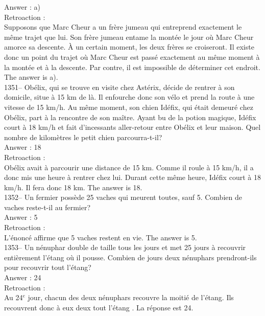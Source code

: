 ﻿\documentclass[letterpaper, 12pt]{article}
\begin{document}
Answer : a)\\

Retroaction : \\
Supposons que Marc Cheur a un fr\`ere jumeau qui entreprend exactement le
m\^eme trajet que lui.  Son fr\`ere jumeau entame la mont\'ee le jour o\`u
Marc Cheur amorce sa descente.  \`A un certain moment, les deux fr\`eres se
croiseront.  Il existe donc un point du trajet o\`u Marc Cheur est pass\'e
exactement au m\^eme moment \`a la mont\'ee et \`a la descente.  Par contre,
il est impossible de d\'eterminer cet endroit.  The answer is a).\\

1351-- Ob\'elix, qui se trouve en visite chez Ast\'erix, d\'ecide de rentrer
\`a son domicile, situe \`a 15 km de l\`a. Il enfourche donc son v\'elo et
prend la route \`a une vitesse de 15 km/h.  Au m\^eme moment, son chien
Id\'efix, qui \'etait demeur\'e chez Ob\'elix, part \`a la rencontre de son
ma\^itre.  Ayant bu de la potion magique, Id\'efix court \`a 18 km/h et fait
d'incessants aller-retour entre Ob\'elix et leur maison.  Quel nombre de
kilom\`etres le petit chien parcourra-t-il?\\

Answer : 18\\

Retroaction : \\
Ob\'elix avait \`a parcourir une distance de 15 km.  Comme il roule \`a 15
km/h, il a donc mis une heure \`a rentrer chez lui.  Durant cette m\^eme
heure, Id\'efix court \`a 18 km/h. Il fera donc 18 km.  The answer is
18.\\

1352-- Un fermier poss\`ede 25 vaches qui meurent toutes, sauf 5.  Combien
de vaches reste-t-il au fermier?\\

Answer : 5\\

Retroaction :\\
L'\'enonc\'e affirme que 5 vaches restent en vie.  The answer is
5.\\

1353-- Un n\'enuphar double de taille tous les jours et met 25 jours \`a
recouvrir enti\`erement l'\'etang o\`u il pousse.  Combien de jours deux
n\'enuphars prendront-ils pour recouvrir tout l'\'etang?\\

Answer : 24\\

Retroaction : \\
Au 24$^e$ jour, chacun des deux n\'enuphars recouvre la moiti\'e de
l'\'etang.  Ils recouvrent donc \`a eux deux tout l'\'etang . La r\'eponse
est 24.  \\
\end{document}
